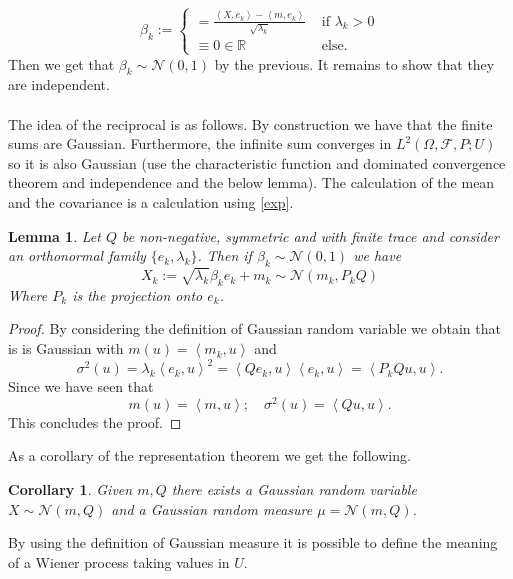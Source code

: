 \documentclass[12pt]{article}
\newcommand{\br}[1]{\left\langle#1\right\rangle}
\newtheorem{lemma}{Lemma}
\newtheorem{corollary}{Corollary}
\begin{document}
\begin{equation*}
	\beta_{k}:=\left\{\begin{array}{ll}
		=\frac{\left\langle X, e_{k}\right\rangle-\left\langle m, e_{k}\right\rangle}{\sqrt{\lambda_{k}}} & \text { if } \lambda_{k}>0 \\
		\equiv 0 \in \mathbb{R}                                                                           & \text { else.}
	\end{array}\right.
\end{equation*}
Then we get that $\beta_k\sim\mathcal{N}(0,1)$ by the previous. It remains to show that they are independent.\\
\\
The idea of the reciprocal is as follows. By construction we have that the finite sums are Gaussian. Furthermore, the infinite sum converges in $L^2(\Omega, \mathcal{F}, P ; U)$ so it is also Gaussian (use the characteristic function and dominated convergence theorem and independence and the below lemma). The calculation of the mean and the covariance is a calculation using \eqref{exp}.
\begin{lemma}
	Let $Q$ be non-negative, symmetric and with finite trace and consider an orthonormal family $\{e_k,\lambda_k\}$. Then if $\beta_k\sim\mathcal{N}(0,1)$ we have
	\begin{equation*}
		X_k:=\sqrt{\lambda_k}\beta_k e_k+m_k\sim\mathcal{N}(m_k,P_kQ)
	\end{equation*}
	Where $P_k$ is the projection onto $e_k$.
\end{lemma}
\begin{proof}
	By considering the definition of Gaussian random variable we obtain that is is Gaussian
	with $m(u)=\br{m_k,u}$ and
	\begin{equation*}
		\sigma^2(u)=\lambda_k\br{e_k,u}^2=\br{Qe_k,u}\br{e_k,u}=\br{P_kQu,u}.
	\end{equation*}
	Since we have seen that
	\begin{equation*}
		m(u)=\br{m,u};\quad \sigma^2(u)=\br{Qu,u}.
	\end{equation*}
	This concludes the proof.
\end{proof}
As a corollary of the representation theorem we get the following.
\begin{corollary} Given $m,Q$ there exists a Gaussian random variable $X\sim\mathcal{N}(m,Q)$ and a Gaussian random measure $\mu=\mathcal{N}(m,Q)$.
\end{corollary}
By using the definition  of Gaussian measure it is possible to define the meaning of a Wiener process taking values in $U$.
\end{document}
